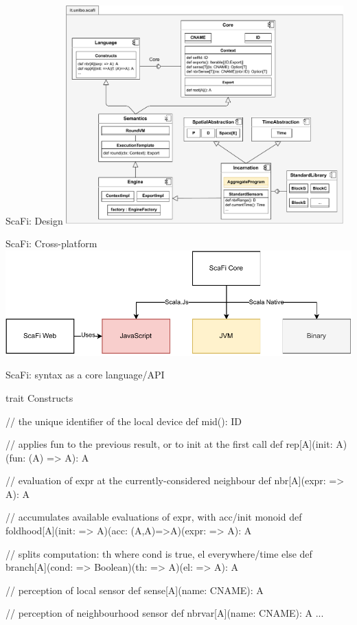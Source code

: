 \documentclass[presentation, 9pt]{beamer}\mode<presentation>{\usetheme{AMSBolognaFC}}
\begin{document}
\begin{frame}{ScaFi: Design}
\centering
\includegraphics[width=0.8\textwidth]{img/scafi-design.drawio.pdf}
\end{frame}
\begin{frame}{ScaFi: Cross-platform}
\includegraphics{img/multi-platform.drawio}
\end{frame}
\begin{frame}[fragile]{ScaFi: syntax as a core language/API}

	\begin{mycode}{}{}{}
trait Constructs {
	// the unique identifier of the local device 
	def mid(): ID
	
	// applies fun to the previous result, or to init at the first call
	def rep[A](init: A)(fun: (A) => A): A
	
	// evaluation of expr at the currently-considered neighbour
	def nbr[A](expr: => A): A
	
	// accumulates available evaluations of expr, with acc/init monoid
	def foldhood[A](init: => A)(acc: (A,A)=>A)(expr: => A): A
	
	// splits computation: th where cond is true, el everywhere/time else
	def branch[A](cond: => Boolean)(th: => A)(el: => A): A
	
	// perception of local sensor
	def sense[A](name: CNAME): A
	
	// perception of neighbourhood sensor
	def nbrvar[A](name: CNAME): A
	...
}
\end{mycode}
\end{frame}
\end{document}
